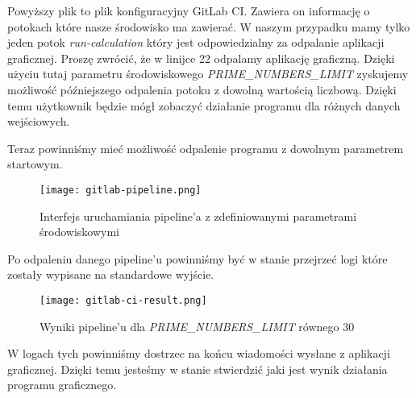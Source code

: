 Powyższy plik to plik konfiguracyjny GitLab CI. Zawiera on informację o potokach które nasze środowisko ma zawierać. W naszym przypadku mamy tylko jeden potok \textit{run-calculation} który jest odpowiedzialny za odpalanie aplikacji graficznej. Proszę zwrócić, że w linijce 22 odpalamy aplikację graficzną. Dzięki użyciu tutaj parametru środowiskowego \textit{PRIME\_NUMBERS\_LIMIT} zyskujemy możliwość późniejszego odpalenia potoku z dowolną wartością liczbową. Dzięki temu użytkownik będzie mógł zobaczyć działanie programu dla różnych danych wejściowych.
\par
Teraz powinniśmy mieć możliwość odpalenie programu z dowolnym parametrem startowym.
\begin{figure}[htbp]
  \centering
  \texttt{[image: gitlab-pipeline.png]}
  \caption{Interfejs uruchamiania pipeline'a z zdefiniowanymi parametrami środowiskowymi}
  \label{fig:gitlab_pipeline}
\end{figure}
Po odpaleniu danego pipeline'u powinniśmy być w stanie przejrzeć logi które zostały wypisane na standardowe wyjście.
\begin{figure}[htbp]
  \centering
  \texttt{[image: gitlab-ci-result.png]}
  \caption{Wyniki pipeline'u dla \textit{PRIME\_NUMBERS\_LIMIT} równego 30}
  \label{fig:gitlab_pipeline_result}
\end{figure}
W logach tych powinniśmy dostrzec na końcu wiadomości wysłane z aplikacji graficznej. Dzięki temu jesteśmy w stanie stwierdzić jaki jest wynik działania programu graficznego.
